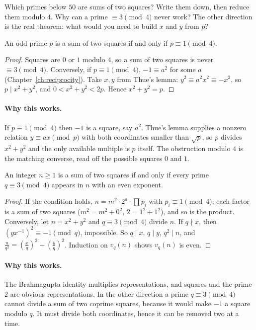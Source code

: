 \begin{think}
Which primes below $50$ are sums of two squares? Write them down, then reduce them modulo $4$. Why can a prime $\equiv3\pmod4$ never work? The other direction is the real theorem: what would you need to build $x$ and $y$ from $p$?
\end{think}

\begin{theorem}\label{thm:twosq}
An odd prime $p$ is a sum of two squares if and only if $p\equiv1\pmod4$.
\end{theorem}
\begin{proof}
Squares are $0$ or $1$ modulo $4$, so a sum of two squares is never $\equiv3\pmod4$. Conversely, if $p\equiv1\pmod4$, $-1\equiv a^2$ for some $a$ (Chapter~\ref{ch:reciprocity}). Take $x,y$ from Thue's lemma: $y^2\equiv a^2x^2\equiv-x^2$, so $p\mid x^2+y^2$, and $0<x^2+y^2<2p$. Hence $x^2+y^2=p$.
\end{proof}

\paragraph{Why this works.}
If $p\equiv 1\pmod 4$ then $-1$ is a square, say $a^2$. Thue's lemma supplies a nonzero relation $y\equiv ax\pmod p$ with both coordinates smaller than $\sqrt p$, so $p$ divides $x^2+y^2$ and the only available multiple is $p$ itself. The obstruction modulo $4$ is the matching converse, read off the possible squares $0$ and $1$.

\begin{theorem}\label{thm:twosqn}
An integer $n\ge1$ is a sum of two squares if and only if every prime $q\equiv3\pmod4$ appears in $n$ with an even exponent.
\end{theorem}
\begin{proof}
If the condition holds, $n=m^2\cdot2^a\cdot\prod p_i$ with $p_i\equiv1\pmod4$; each factor is a sum of two squares ($m^2=m^2+0^2$, $2=1^2+1^2$), and so is the product. Conversely, let $n=x^2+y^2$ and $q\equiv3\pmod4$ divide $n$. If $q\nmid x$, then $\left(yx^{-1}\right)^2\equiv-1\pmod q$, impossible. So $q\mid x$, $q\mid y$, $q^2\mid n$, and $\frac n{q^2}=\left(\frac xq\right)^2+\left(\frac yq\right)^2$. Induction on $v_q(n)$ shows $v_q(n)$ is even.
\end{proof}

\paragraph{Why this works.}
The Brahmagupta identity multiplies representations, and squares and the prime $2$ are obvious representations. In the other direction a prime $q\equiv 3\pmod 4$ cannot divide a sum of two coprime squares, because it would make $-1$ a square modulo $q$. It must divide both coordinates, hence it can be removed two at a time.

